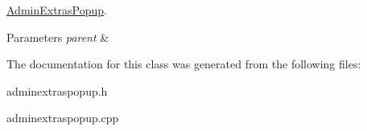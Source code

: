 \hyperlink{class_admin_extras_popup}{Admin\+Extras\+Popup}. 


\begin{DoxyParams}{Parameters}
{\em parent} & \\
\hline
\end{DoxyParams}


The documentation for this class was generated from the following files\+:\begin{DoxyCompactItemize}
\item 
adminextraspopup.\+h\item 
adminextraspopup.\+cpp\end{DoxyCompactItemize}
